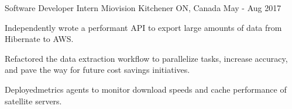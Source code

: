 \begin{cventries}
\cventry
    {Software Developer Intern}
    {Miovision}
    {Kitchener ON, Canada}
    {May - Aug 2017}
    {
      \begin{cvitems}
        \item Independently wrote a performant API to export large amounts of data from Hibernate to AWS.
        \item Refactored the data extraction workflow to parallelize tasks, increase accuracy, and pave the way
        for future cost savings initiatives.
        \item Deployedmetrics agents to monitor download speeds and cache performance of satellite servers.
      \end{cvitems}
    }

\end{cventries}